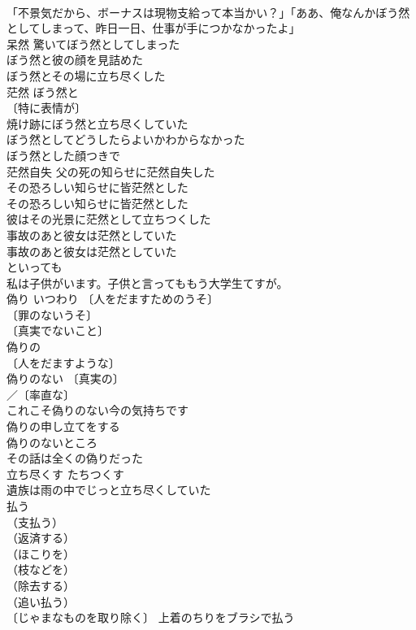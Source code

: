 \documentclass[8pt]{extreport}
\begin{document}
\begin{CJK}{UTF8}{min}
\\	「不景気だから、ボーナスは現物支給って本当かい？」「ああ、俺なんかぼう然としてしまって、昨日一日、仕事が手につかなかったよ」 
\\	呆然 驚いてぼう然としてしまった 
\\	ぼう然と彼の顔を見詰めた 
\\	ぼう然とその場に立ち尽くした 
\\	茫然 ぼう然と 
\\	〔特に表情が〕
\\	焼け跡にぼう然と立ち尽くしていた 
\\	ぼう然としてどうしたらよいかわからなかった 
\\	ぼう然とした顔つきで 
\\	茫然自失 父の死の知らせに茫然自失した 
\\	その恐ろしい知らせに皆茫然とした 
\\	その恐ろしい知らせに皆茫然とした 
\\	彼はその光景に茫然として立ちつくした 
\\	事故のあと彼女は茫然としていた 
\\	事故のあと彼女は茫然としていた 
\\	といっても		
\\	私は子供がいます。子供と言ってももう大学生てすが。 
\\	偽り	いつわり	〔人をだますためのうそ〕
\\	〔罪のないうそ〕
\\	〔真実でないこと〕
\\	偽りの 
\\	〔人をだますような〕
\\	偽りのない 〔真実の〕
\\	／〔率直な〕
\\	これこそ偽りのない今の気持ちです 
\\	偽りの申し立てをする 
\\	偽りのないところ 
\\	その話は全くの偽りだった 
\\	立ち尽くす	たちつくす	
\\	遺族は雨の中でじっと立ち尽くしていた 
\\	払う		
\\	（支払う）
\\	（返済する）
\\	（ほこりを）
\\	（枝などを）
\\	（除去する）
\\	（追い払う）
\\	〔じゃまなものを取り除く〕 上着のちりをブラシで払う 

\end{CJK}
\end{document}
